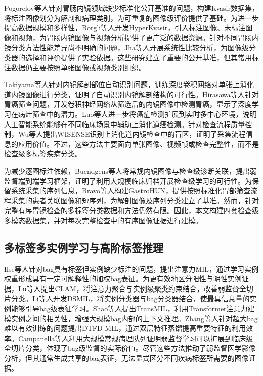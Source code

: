 \documentclass[Afour,sagev,times]{sagej}
\begin{document}
Pogorelov等人针对胃肠内镜领域缺少标准化公开基准的问题，构建Kvasir数据集，将标注图像划分为解剖和病理类别，为可重复的图像级评价提供了基础。为进一步提高数据规模和多样性，Borgli等人开发HyperKvasir，引入标注图像、未标注图像和视频，为胃肠内镜图像与视频分析提供了更广泛的数据资源。针对不同胃肠内镜分类方法性能差异尚不明确的问题，Jha等人开展系统性比较分析，为图像级分类器的选择和评价提供了实验依据。这些研究建立了重要的公开基准，但其常用标注数据仍主要按照单张图像或视频类别组织。 \cite{R1} \cite{R2} \cite{R3}

Takiyama等人针对内镜解剖部位自动识别问题，训练深度卷积网络对单张上消化道内镜图像进行分类，证明了自动识别内镜解剖结构的可行性。Hirasawa等人针对胃癌筛查问题，开发卷积神经网络从筛选后的内镜图像中检测胃癌，显示了深度学习在病灶筛查中的潜力。Luo等人进一步将癌症检测扩展到实时多中心环境，说明人工智能系统能够在不同临床场景中辅助上消化道癌检测。针对检查流程质量控制，Wu等人提出WISENSE识别上消化道内镜检查中的盲区，证明了采集流程信息的应用价值。不过，这些方法主要面向单张图像、视频帧或检查完整性，而不是检查级多标签疾病分类。 \cite{R4} \cite{R5} \cite{R6} \cite{R7}

为减少逐图标注依赖，Buendgens等人将常规内镜图像与检查级诊断关联，提出弱监督端到端学习框架，证明了利用大规模临床归档开展检查级学习的可行性。为保留系统采集的序列信息，Bravo等人构建GastroHUN，提供按照标准化胃部筛查流程采集的患者关联图像和短序列，为解剖图像及序列分类建立了基准。然而，针对完整有序胃镜检查的多标签分类数据和方法仍然有限。因此，本文构建四套检查级多模态数据集，并对每次完整检查中的有序图像证据进行建模。 \cite{R8} \cite{R9}

\subsection{多标签多实例学习与高阶标签推理}

Ilse等人针对bag具有标签但实例缺少标注的问题，提出注意力MIL，通过学习实例权重形成具有一定可解释性的加权bag表征。为更有效地区分阳性与阴性实例证据，Lu等人提出CLAM，将注意力聚合与实例级聚类约束结合，改善弱监督全切片分类。Li等人开发DSMIL，将实例分类器与bag分类器结合，使最具信息量的实例能够引导bag级表征学习。Shao等人提出TransMIL，利用Transformer注意力建模实例之间的相关性，增强大规模bag内部的上下文推理。Zhang等人针对超大bag难以有效训练的问题提出DTFD-MIL，通过双层特征蒸馏提高重要特征的利用效率。Campanella等人利用大规模常规病理队列证明弱监督学习可以扩展到临床级全切片分类，体现了bag级监督的实际价值。尽管这些方法推动了弱监督医学影像分析，但其通常生成共享的bag表征，无法显式区分不同疾病标签所需要的图像证据。 \cite{R10} \cite{R11} \cite{R12} \cite{R13} \cite{R14} \cite{R15}
\end{document}
